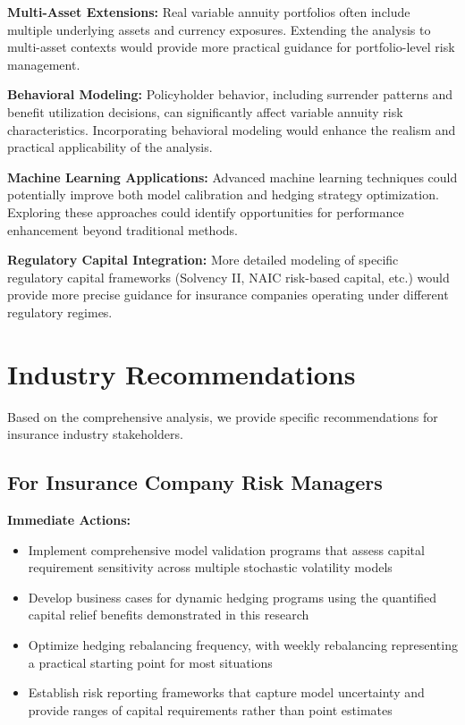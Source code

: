 \documentclass[12pt,a4paper]{report}
\begin{document}
\textbf{Multi-Asset Extensions:} Real variable annuity portfolios often include multiple underlying assets and currency exposures. Extending the analysis to multi-asset contexts would provide more practical guidance for portfolio-level risk management.

\textbf{Behavioral Modeling:} Policyholder behavior, including surrender patterns and benefit utilization decisions, can significantly affect variable annuity risk characteristics. Incorporating behavioral modeling would enhance the realism and practical applicability of the analysis.

\textbf{Machine Learning Applications:} Advanced machine learning techniques could potentially improve both model calibration and hedging strategy optimization. Exploring these approaches could identify opportunities for performance enhancement beyond traditional methods.

\textbf{Regulatory Capital Integration:} More detailed modeling of specific regulatory capital frameworks (Solvency II, NAIC risk-based capital, etc.) would provide more precise guidance for insurance companies operating under different regulatory regimes.

\section{Industry Recommendations}

Based on the comprehensive analysis, we provide specific recommendations for insurance industry stakeholders.

\subsection{For Insurance Company Risk Managers}

\textbf{Immediate Actions:}
\begin{itemize}
\item Implement comprehensive model validation programs that assess capital requirement sensitivity across multiple stochastic volatility models
\item Develop business cases for dynamic hedging programs using the quantified capital relief benefits demonstrated in this research
\item Optimize hedging rebalancing frequency, with weekly rebalancing representing a practical starting point for most situations
\item Establish risk reporting frameworks that capture model uncertainty and provide ranges of capital requirements rather than point estimates
\end{itemize}
\end{document}
